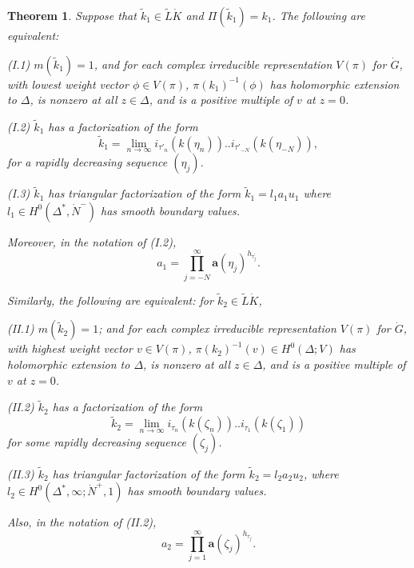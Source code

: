 \documentclass{amsart}
\newtheorem{theorem}{Theorem}[section]
\theoremstyle{conjecture}
\theoremstyle{definition}
\theoremstyle{question}
\theoremstyle{questions}
\theoremstyle{remark}
\theoremstyle{remarks}
\theoremstyle{example}
\numberwithin{equation}{section}
\begin{document}
\begin{theorem}\label{Ktheorem1smooth} Suppose that $\tilde k_1 \in \tilde L \dot{K}$
and $\Pi(\tilde k_1)=k_1$. The following are equivalent:


(I.1) $m(\tilde k_1)=1$, and for each complex irreducible
representation $V(\pi)$ for $\dot{G}$, with lowest weight vector
$\phi \in V(\pi)$, $\pi(k_1)^{-1}(\phi)$ has holomorphic extension
to $\Delta$, is nonzero at all $z\in \Delta$, and is a positive
multiple of $v$ at $z=0$.

(I.2) $\tilde k_1$ has a factorization of the form
$$\tilde k_1=\lim_{n\to\infty}i_{\tau'_n}(k(\eta_n))..i_{\tau'_{-N}}(k(\eta_{-N})),$$
for a rapidly decreasing sequence $(\eta_j)$.

(I.3) $\tilde k_1$ has triangular factorization of the form
$\tilde k_1=l_1a_1u_1$ where $l_1\in H^0(\Delta^*,\dot N^-)$ has
smooth boundary values.

Moreover, in the notation of (I.2),
$$a_1=\prod_{j=-N}^{\infty}\mathbf a(\eta_j)^{h_{\tau^{\prime}_j}}.$$

Similarly, the following are equivalent: for $\tilde k_2 \in
\tilde L \dot{K}$,

(II.1) $m(\tilde k_2)=1$; and for each complex irreducible
representation $V(\pi)$ for $\dot{G}$, with highest weight vector
$v \in V(\pi)$, $\pi(k_2)^{-1}(v)\in H^0(\Delta;V)$ has
holomorphic extension to $\Delta$, is nonzero at all $z\in
\Delta$, and is a positive multiple of $v$ at $z=0$.

(II.2) $\tilde k_2$ has a factorization of the form
$$\tilde k_2=\lim_{n\to\infty}i_{\tau_n}(k(\zeta_n))..i_{\tau_1}(k(\zeta_1))$$
for some rapidly decreasing sequence $(\zeta_j)$.

(II.3) $\tilde k_2$ has triangular factorization of the form
$\tilde k_2=l_2a_2u_2$, where $l_2 \in H^0(\Delta^*,\infty;\dot
N^+,1)$ has smooth boundary values.

Also, in the notation of (II.2),
\begin{equation}\label{product2}a_2=\prod_{j=1}^{\infty}\mathbf a(\zeta_j)^{h_{\tau_j}}.\end{equation}

\end{theorem}
\end{document}

